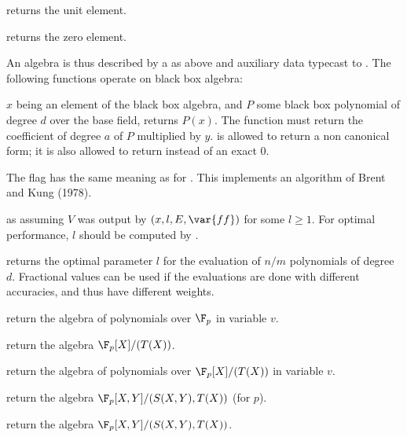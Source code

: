  returns the unit element.

 returns the zero element.

\noindent An algebra is thus described by a  as above
and auxiliary data typecast to . The following functions operate
on black box algebra:

$x$ being an element of the black box algebra, and $P$ some black box
polynomial of degree $d$ over the base field,  returns $P(x)$. The function
 must return the coefficient of degree $a$ of $P$
multiplied by $y$.  is allowed to return a non canonical form;
it is also allowed to return  instead of an exact $0$.

The flag  has the same meaning as for . This
implements an algorithm of Brent and Kung (1978).

as  assuming $V$ was output by
$(x, l, E, \var{ff})$ for some $l\geq 1$. For optimal
performance, $l$ should be computed by .

 returns the optimal
parameter $l$ for the evaluation of $n/m$ polynomials of degree $d$.
Fractional values can be used if the evaluations are done with different
accuracies, and thus have different weights.


return the algebra of polynomials over $\F_p$ in variable $v$.

return the algebra $\F_p[X]/(T(X))$.

return the algebra of polynomials over $\F_p[X]/(T(X))$ in variable $v$.

return the algebra $\F_p[X,Y]/(S(X,Y),T(X))$ (for  $p$).

return the algebra $\F_p[X,Y]/(S(X,Y),T(X))$.


